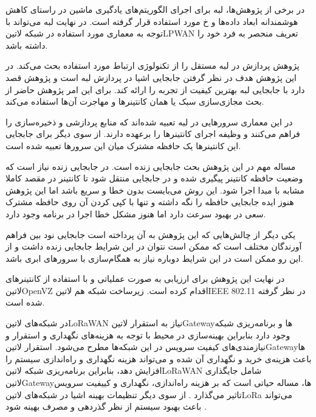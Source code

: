 در برخی از پژوهش‌ها، لبه برای اجرای الگوریتم‌های یادگیری ماشین در راستای کاهش هوشمندانه ابعاد داده‌ها و ‌خ مورد استفاده قرار گرفته است.
در نهایت لبه می‌تواند با توجه به معماری مورد استفاده در شبکه ‌لاتین{LPWAN} تعریف منحصر به فرد خود را داشته باشد.


پژوهش  پردازش در لبه مستقل را از تکنولوژی ارتباط مورد استفاده بحث می‌کند. در این پژوهش هدف در نظر گرفتن جابجایی اشیا در پردازش لبه است و پژوهش قصد دارد
با جابجایی لبه بهترین کیفیت از تجربه را ارائه کند. برای این امر پژوهش حاضر از بحث مجازی‌سازی سبک یا همان کانتینرها و مهاجرت آن‌ها استفاده می‌کند.

در این معماری سرورهایی در لبه تعبیه شده‌اند که منابع پردازشی و ذخیره‌سازی را فراهم می‌کنند و وظیفه اجرای کانتینرها را برعهده دارند. از سوی دیگر برای جابجایی این کانتینرها یک حافظه مشترک
میان این سرورها تعبیه شده است.

مساله مهم در این پژوهش بحث جابجایی زنده است. در جابجایی زنده نیاز است که وضعیت حافظه کانتینر پیگیری شده و در جابجایی منتقل شود تا کانتینر در مقصد کاملا مشابه با مبدا اجرا شود.
این روش می‌بایست بدون خطا و سریع باشد اما این پژوهش هنوز ایده جابجایی حافظه را نگه داشته و تنها با کپی کردن آن روی حافظه مشترک سعی در بهبود سرعت دارد اما هنوز مشکل خطا
اجرا در برنامه وجود دارد.

یکی دیگر از چالش‌هایی که این پژوهش به آن پرداخته است جابجایی نود بین فراهم آورندگان مختلف است که ممکن است نتوان در این شرایط جابجایی زنده داشت و از این رو ممکن است
در این شرایط دوباره نیاز به همگام‌سازی با سرورهای ابری باشد.

در نهایت این پژوهش برای ارزیابی به صورت عملیاتی و با استفاده از کانتینرهای ‌لاتین{OpenVZ} اقدام کرده است. زیرساخت شبکه هم ‌لاتین{IEEE 802.11} در نظر گرفته شده است.



در شبکه‌های ‌لاتین{LoRaWAN} نیاز به استقرار ‌لاتین{Gateway}ها و برنامه‌ریزی شبکه وجود دارد بنابراین بهینه‌سازی در محیط با توجه به هزینه‌های نگهداری و استقرار و نیازمندی‌های کیفیت سرویس
در این شبکه‌ها مطرح می‌شود. استقرار ‌لاتین{Gateway}ها باعث هزینه‌ی خرید و نگهداری آن شده و می‌تواند هزینه نگهداری و راه‌اندازی سیستم را افزایش دهد،
بنابراین برنامه‌ریزی شبکه ‌لاتین{LoRaWAN} شامل جایگذاری ‌لاتین{Gateway}ها، مساله حیاتی است که بر هزینه راه‌اندازی، نگهداری و کییفیت سرویس تاثیر می‌گذارد
.
از سوی دیگر تنظیمات بهینه اشیا در شبکه‌های ‌لاتین{LoRa} می‌تواند باعث بهبود سیستم از نظر گذردهی و مصرف بهینه شود
.

